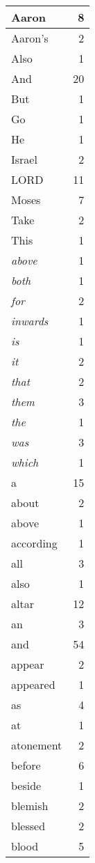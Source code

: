 \begin{center}
\begin{longtable}{l|r}
\hline \hline
\endlastfoot
Aaron & 8 \\ \hline
Aaron's & 2 \\ \hline
Also & 1 \\ \hline
And & 20 \\ \hline
But & 1 \\ \hline
Go & 1 \\ \hline
He & 1 \\ \hline
Israel & 2 \\ \hline
LORD & 11 \\ \hline
Moses & 7 \\ \hline
Take & 2 \\ \hline
This & 1 \\ \hline
\emph{above} & 1 \\ \hline
\emph{both} & 1 \\ \hline
\emph{for} & 2 \\ \hline
\emph{inwards} & 1 \\ \hline
\emph{is} & 1 \\ \hline
\emph{it} & 2 \\ \hline
\emph{that} & 2 \\ \hline
\emph{them} & 3 \\ \hline
\emph{the} & 1 \\ \hline
\emph{was} & 3 \\ \hline
\emph{which} & 1 \\ \hline
a & 15 \\ \hline
about & 2 \\ \hline
above & 1 \\ \hline
according & 1 \\ \hline
all & 3 \\ \hline
also & 1 \\ \hline
altar & 12 \\ \hline
an & 3 \\ \hline
and & 54 \\ \hline
appear & 2 \\ \hline
appeared & 1 \\ \hline
as & 4 \\ \hline
at & 1 \\ \hline
atonement & 2 \\ \hline
before & 6 \\ \hline
beside & 1 \\ \hline
blemish & 2 \\ \hline
blessed & 2 \\ \hline
blood & 5 \\ \hline

\end{longtable}
\end{center}
